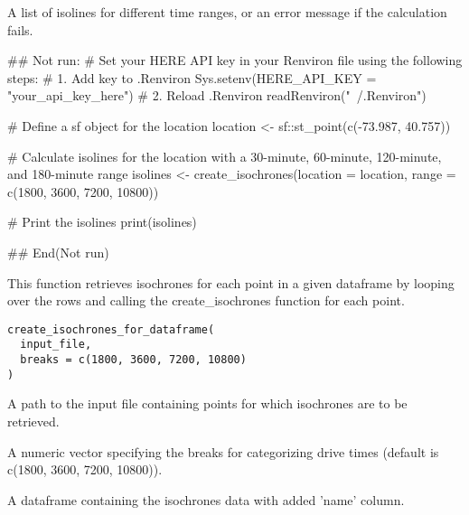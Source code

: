 \documentclass[a4paper]{book}
\begin{document}
%
\begin{Value}
A list of isolines for different time ranges, or an error message if the calculation fails.
\end{Value}
%
\begin{Examples}
\begin{ExampleCode}
## Not run: 
# Set your HERE API key in your Renviron file using the following steps:
# 1. Add key to .Renviron
Sys.setenv(HERE_API_KEY = "your_api_key_here")
# 2. Reload .Renviron
readRenviron("~/.Renviron")

# Define a sf object for the location
location <- sf::st_point(c(-73.987, 40.757))

# Calculate isolines for the location with a 30-minute, 60-minute, 120-minute, and 180-minute range
isolines <- create_isochrones(location = location, range = c(1800, 3600, 7200, 10800))

# Print the isolines
print(isolines)


## End(Not run)

\end{ExampleCode}
\end{Examples}
%
\begin{Description}
This function retrieves isochrones for each point in a given dataframe by looping
over the rows and calling the create\_isochrones function for each point.
\end{Description}
%
\begin{Usage}
\begin{verbatim}
create_isochrones_for_dataframe(
  input_file,
  breaks = c(1800, 3600, 7200, 10800)
)
\end{verbatim}
\end{Usage}
%
\begin{Arguments}
\begin{ldescription}
\item[\code{input\_file}] A path to the input file containing points for which isochrones are to be retrieved.

\item[\code{breaks}] A numeric vector specifying the breaks for categorizing drive times (default is c(1800, 3600, 7200, 10800)).
\end{ldescription}
\end{Arguments}
%
\begin{Value}
A dataframe containing the isochrones data with added 'name' column.
\end{Value}
\end{document}
